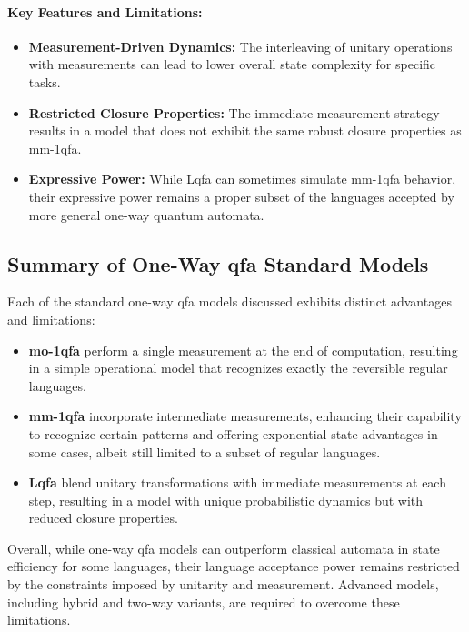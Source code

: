 \paragraph{Key Features and Limitations:}
\begin{itemize}
    \item \textbf{Measurement-Driven Dynamics:} The interleaving of unitary operations with measurements can lead to lower overall state complexity for specific tasks.
    \item \textbf{Restricted Closure Properties:} The immediate measurement strategy results in a model that does not exhibit the same robust closure properties as \gls{mm-1qfa}.
    \item \textbf{Expressive Power:} While Lqfa can sometimes simulate \gls{mm-1qfa} behavior, their expressive power remains a proper subset of the languages accepted by more general one-way quantum automata.
\end{itemize}

\subsection*{Summary of One-Way qfa Standard Models}
Each of the standard one-way \gls{qfa} models discussed exhibits distinct advantages and limitations:
\begin{itemize}
    \item \textbf{\gls{mo-1qfa}} perform a single measurement at the end of computation, resulting in a simple operational model that recognizes exactly the reversible regular languages.
    \item \textbf{\gls{mm-1qfa}} incorporate intermediate measurements, enhancing their capability to recognize certain patterns and offering exponential state advantages in some cases, albeit still limited to a subset of regular languages.
    \item \textbf{Lqfa} blend unitary transformations with immediate measurements at each step, resulting in a model with unique probabilistic dynamics but with reduced closure properties.
\end{itemize}
Overall, while one-way \gls{qfa} models can outperform classical automata in state efficiency for some languages, their language acceptance power remains restricted by the constraints imposed by unitarity and measurement. Advanced models, including hybrid and two-way variants, are required to overcome these limitations.

